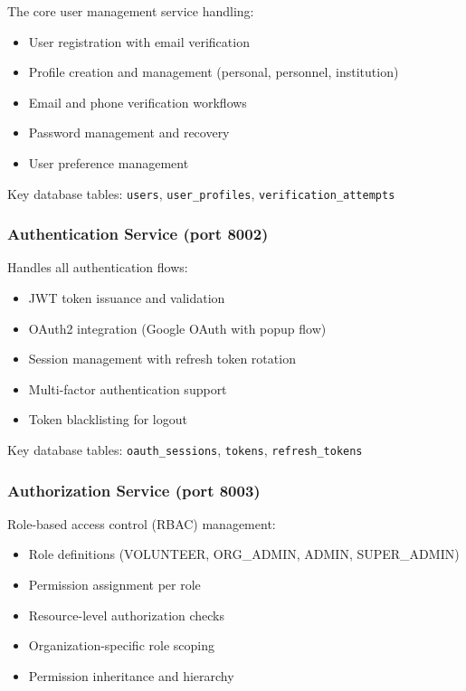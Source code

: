 The core user management service handling:
\begin{itemize}
  \item User registration with email verification
  \item Profile creation and management (personal, personnel, institution)
  \item Email and phone verification workflows
  \item Password management and recovery
  \item User preference management
\end{itemize}

Key database tables: \texttt{users}, \texttt{user\_profiles}, \texttt{verification\_attempts}

\subsubsection{Authentication Service (port 8002)}

Handles all authentication flows:
\begin{itemize}
  \item JWT token issuance and validation
  \item OAuth2 integration (Google OAuth with popup flow)
  \item Session management with refresh token rotation
  \item Multi-factor authentication support
  \item Token blacklisting for logout
\end{itemize}

Key database tables: \texttt{oauth\_sessions}, \texttt{tokens}, \texttt{refresh\_tokens}

\subsubsection{Authorization Service (port 8003)}

Role-based access control (RBAC) management:
\begin{itemize}
  \item Role definitions (VOLUNTEER, ORG\_ADMIN, ADMIN, SUPER\_ADMIN)
  \item Permission assignment per role
  \item Resource-level authorization checks
  \item Organization-specific role scoping
  \item Permission inheritance and hierarchy
\end{itemize}

